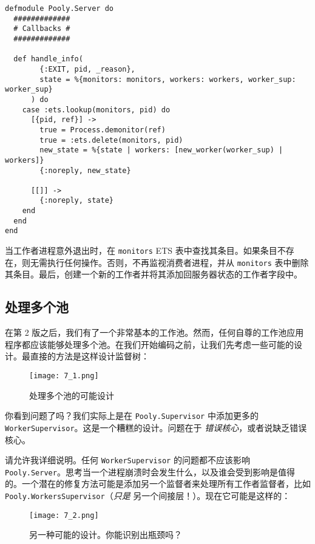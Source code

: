 \begin{code}{}
\begin{verbatim}
defmodule Pooly.Server do
  #############
  # Callbacks #
  #############

  def handle_info(
        {:EXIT, pid, _reason},
        state = %{monitors: monitors, workers: workers, worker_sup: worker_sup}
      ) do
    case :ets.lookup(monitors, pid) do
      [{pid, ref}] ->
        true = Process.demonitor(ref)
        true = :ets.delete(monitors, pid)
        new_state = %{state | workers: [new_worker(worker_sup) | workers]}
        {:noreply, new_state}

      [[]] ->
        {:noreply, state}
    end
  end
end
\end{verbatim}
\end{code}

当工作者进程意外退出时，在 \texttt{monitors} ETS
表中查找其条目。如果条目不存在，则无需执行任何操作。否则，不再监视消费者进程，并从
\texttt{monitors}
表中删除其条目。最后，创建一个新的工作者并将其添加回服务器状态的工作者字段中。

 \subsection{ 处理多个池}

在第 2
版之后，我们有了一个非常基本的工作池。然而，任何自尊的工作池应用程序都应该能够处理多个池。在我们开始编码之前，让我们先考虑一些可能的设计。最直接的方法是这样设计监督树：

\begin{figure}[!ht]
    \centering
    \texttt{[image: 7\_1.png]}
    \caption{处理多个池的可能设计}
    \label{fig:7_1}
\end{figure}


你看到问题了吗？我们实际上是在
\texttt{Pooly.Supervisor} 中添加更多的
\texttt{WorkerSupervisor}。这是一个糟糕的设计。问题在于
\emph{错误核心}，或者说缺乏错误核心。

请允许我详细说明。任何 \texttt{WorkerSupervisor}
的问题都不应该影响
\texttt{Pooly.Server}。思考当一个进程崩溃时会发生什么，以及谁会受到影响是值得的。一个潜在的修复方法可能是添加另一个监督者来处理所有工作者监督者，比如
\texttt{Pooly.WorkersSupervisor}（\emph{只是}
另一个间接层！）。现在它可能是这样的：

\begin{figure}[!ht]
    \centering
    \texttt{[image: 7\_2.png]}
    \caption{另一种可能的设计。你能识别出瓶颈吗？}
    \label{fig:7_2}
\end{figure}


